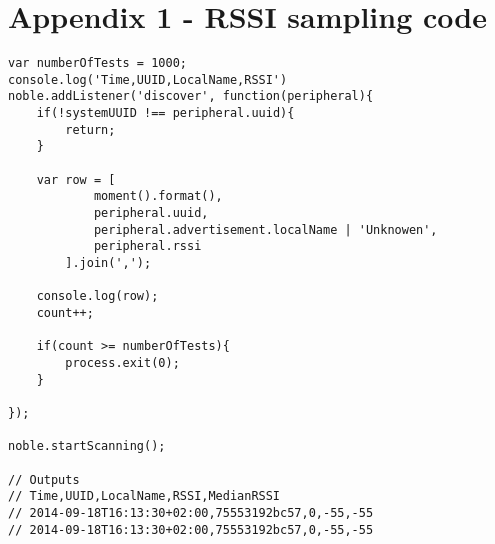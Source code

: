 
\chapter{Appendix 1 - RSSI sampling code}

\begin{lstlisting}[]
var numberOfTests = 1000;
console.log('Time,UUID,LocalName,RSSI')
noble.addListener('discover', function(peripheral){
	if(!systemUUID !== peripheral.uuid){
		return;
	}
	
	var row = [
			moment().format(),
			peripheral.uuid,
			peripheral.advertisement.localName | 'Unknowen',
			peripheral.rssi
		].join(',');
	
	console.log(row);
	count++;
	
	if(count >= numberOfTests){
		process.exit(0);
	}

});

noble.startScanning();

// Outputs
// Time,UUID,LocalName,RSSI,MedianRSSI
// 2014-09-18T16:13:30+02:00,75553192bc57,0,-55,-55
// 2014-09-18T16:13:30+02:00,75553192bc57,0,-55,-55
\end{lstlisting}